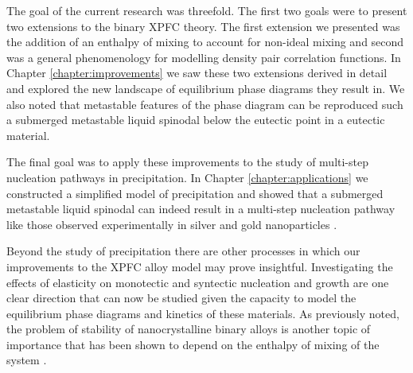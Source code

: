 \label{chapter:conclusion}

The goal of the current research was threefold. The first two goals were to
present two extensions to the binary XPFC theory. The first extension we
presented was the addition of an enthalpy of mixing to account for non-ideal
mixing and second was a general phenomenology for modelling density pair
correlation functions. In Chapter \ref{chapter:improvements} we saw these two
extensions derived in detail and explored the new landscape of equilibrium
phase diagrams they result in. We also noted that metastable features of the
phase diagram can be reproduced such a submerged metastable liquid spinodal
below the eutectic point in a eutectic material. 

The final goal was to apply these improvements to the study of multi-step
nucleation pathways in precipitation. In Chapter \ref{chapter:applications} we
constructed a simplified model of precipitation and showed that a submerged
metastable liquid spinodal can indeed result in a multi-step nucleation pathway
like those observed experimentally in silver and gold nanoparticles
\cite{LOH17}. 

Beyond the study of precipitation there are other processes in which our
improvements to the XPFC alloy model may prove insightful. Investigating the
effects of elasticity on monotectic and  syntectic nucleation and growth are
one clear direction that can now be studied given the capacity to model the
equilibrium phase diagrams and kinetics of these materials. As previously
noted, the problem of stability of nanocrystalline binary alloys is another
topic of importance that has  been shown to depend on the enthalpy of mixing of
the system \cite{MURDOCH13}.
